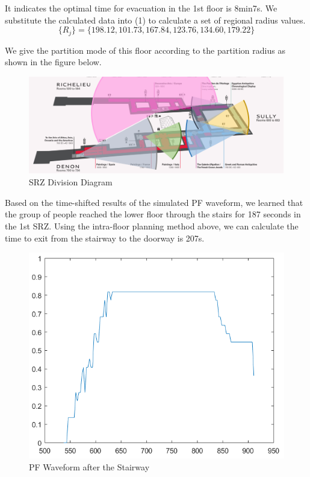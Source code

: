 It indicates the optimal time for evacuation in the 1st floor is 8min7s. We substitute the calculated data into (1) to calculate a set of regional radius values.
\[
\{R_j\}=\{198.12,101.73,167.84,123.76,134.60,179.22\}
\]

We give the partition mode of this floor according to the partition radius as shown in the figure below.
\begin{figure}[H]
    \centering
    \includegraphics[scale=0.3]{huafen.png}
    \caption{SRZ Division Diagram}
    \label{1}
\end{figure}


Based on the time-shifted results of the simulated PF waveform, we learned that the group of people reached the lower floor through the stairs for 187 seconds in the 1st SRZ. Using the intra-floor planning method above, we can calculate the time to exit from the stairway to the doorway is 207s.

\begin{figure}[H]
    \centering
    \includegraphics[scale=0.37]{05.png}
    \caption{PF Waveform after the Stairway}
    \label{1}
\end{figure}

